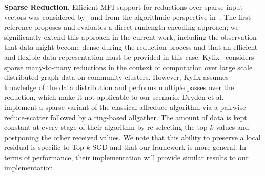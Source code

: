 \documentclass[11pt]{article}
\renewcommand{\paragraph}[1]{\vspace{0.1em} \noindent \textbf{#1}}
\begin{document}
\paragraph{Sparse Reduction.} Efficient MPI support for reductions over sparse input vectors was considered by~\cite{hofmann2008mpi} and from the algorithmic perspective in~\cite{traff2010transparent}. 
The first reference proposes and evaluates a direct runlength encoding approach; we significantly extend this approach in the current work, including the observation that data might become dense during the reduction process and that an efficient and flexible data representation must be provided in this case. Kylix~\cite{zhao2014kylix} considers sparse many-to-many reductions in the context of computation over large scale distributed graph data on community clusters. However, Kylix assumes knowledge of the data distribution and performs multiple passes over the reduction, which make it not applicable to our scenario. 
Dryden et al.~\cite{dryden2016communication} implement a sparse variant of the classical allreduce algorithm via a pairwise reduce-scatter followed by a ring-based allgather. The amount of data is kept constant at every stage of their algorithm by re-selecting the top $k$ values and postponing the other received values. We note that this ability to preserve a local residual is specific to Top-$k$ SGD and that our framework is more general. In terms of performance, their implementation will provide similar results to our \ssartwo{} implementation. 
\end{document}
